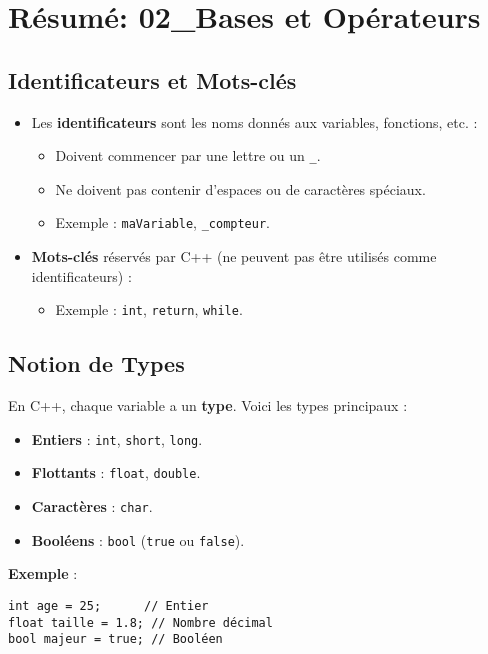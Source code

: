 \section{ Résumé: 02\_Bases et Opérateurs}

\subsection{ Identificateurs et Mots-clés}
\begin{itemize}
    \item Les \textbf{identificateurs} sont les noms donnés aux variables, fonctions, etc. :
    \begin{itemize}
        \item Doivent commencer par une lettre ou un \texttt{\_}.
        \item Ne doivent pas contenir d'espaces ou de caractères spéciaux.
        \item Exemple : \texttt{maVariable}, \texttt{\_compteur}.
    \end{itemize}
    \item \textbf{Mots-clés} réservés par C++ (ne peuvent pas être utilisés comme identificateurs) :
    \begin{itemize}
        \item Exemple : \texttt{int}, \texttt{return}, \texttt{while}.
    \end{itemize}
\end{itemize}

\subsection{ Notion de Types}
En C++, chaque variable a un \textbf{type}. Voici les types principaux :
\begin{itemize}
    \item \textbf{Entiers} : \texttt{int}, \texttt{short}, \texttt{long}.
    \item \textbf{Flottants} : \texttt{float}, \texttt{double}.
    \item \textbf{Caractères} : \texttt{char}.
    \item \textbf{Booléens} : \texttt{bool} (\texttt{true} ou \texttt{false}).
\end{itemize}

\textbf{Exemple} :
\begin{tcolorbox}[colframe=blue!50!black, colback=blue!5!white, title=Exemple de Types]
\begin{verbatim}
int age = 25;      // Entier
float taille = 1.8; // Nombre décimal
bool majeur = true; // Booléen
\end{verbatim}
\end{tcolorbox}

